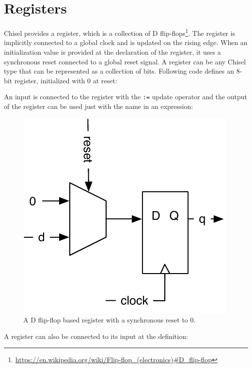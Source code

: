 \documentclass[%
    10pt,
    headinclude, footexclude,
    openright, %
    notitlepage,
    cleardoubleempty,
    headsepline,
    pointlessnumbers,
    bibtotoc, idxtotoc,
    ]{scrbook}
\newcommand{\code}[1]{{\small{\texttt{#1}}}}
\newcommand{\scale}{0.7}
\newcommand{\myref}[2]{\href{#1}{#2}}
\renewcommand{\myref}[2]{{#2}{\footnote{\url{#1}}}}
\begin{document}
\section{Registers}

Chisel provides a register, which is a collection of
\myref{https://en.wikipedia.org/wiki/Flip-flop\_(electronics)\#D\_flip-flop}{D flip-flops}.
The register is implicitly connected to a global clock and is updated on the rising edge.
When an initialization value is provided at the declaration of the register,
it uses a synchronous reset connected to a global reset signal.
A register can be any Chisel type that can be represented as a collection of bits.
Following code defines an 8-bit register, initialized with 0 at reset:


\noindent An input is connected to the register with the \code{:=} update operator and
the output of the register can be used just with the name in an expression:


\begin{figure}
  \centering
  \includegraphics[scale=\scale]{figures/register-reset-0}
  \caption{A D flip-flop based register with a synchronous reset to 0.}
  \label{fig:register-reset-0}
\end{figure}

\noindent A register can also be connected to its input at the definition:

\end{document}
